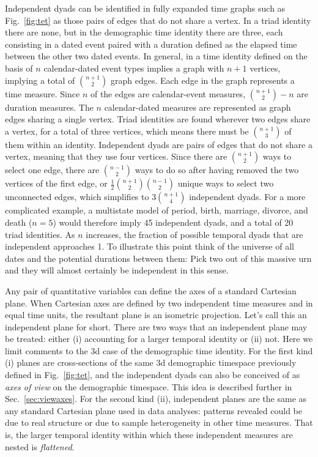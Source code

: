 Independent dyads can be identified in fully expanded time graphs such as Fig.~\ref{fig:tet} as those pairs of edges that do not share a vertex. In a triad identity there are none, but in the demographic time identity there are three, each consisting in a dated event paired with a duration defined as the elapsed time between the other two dated events. In general, in a time identity defined on the basis of $n$ calendar-dated event types implies a graph with $n+1$ vertices, implying a total of $\binom{n+1}{2}$ graph edges. Each edge in the graph represents a time measure. Since $n$ of the edges are calendar-event measures, $\binom{n+1}{2} - n$ are duration measures. The $n$ calendar-dated measures are represented as graph edges sharing a single vertex. Triad identities are found wherever two edges share a vertex, for a total of three vertices, which means there must be $\binom{n+1}{3}$ of them within an identity. Independent dyads are pairs of edges that do not share a vertex, meaning that they use four vertices. Since there are $\binom{n+1}{2}$ ways to select one edge, there are $\binom{n-1}{2}$ ways to do so after having removed the two vertices of the first edge, or $\frac{1}{2}\binom{n+1}{2}\binom{n-1}{2}$ unique ways to select two unconnected edges, which simplifies to $3\binom{n+1}{4}$ independent dyads. For a more complicated example, a multistate model of period, birth, marriage, divorce, and death ($n=5$) would therefore imply 45 independent dyads, and a total of 20 triad identities. As $n$ increases, the fraction of possible temporal dyads that are independent approaches 1. To illustrate this point think of the universe of all dates and the potential durations between them: Pick two out of this massive urn and they will almost certainly be independent in this sense.

Any pair of quantitative variables can define the axes of a standard Cartesian plane. When Cartesian axes are defined by two independent time measures and in equal time units, the resultant plane is an isometric projection. Let's call this an independent plane for short. There are two ways that an independent plane may be treated: either (i) accounting for a larger temporal identity or (ii) not. Here we limit comments to the 3d case of the demographic time identity. For the first kind (i) planes are cross-sections of the same 3d demographic timespace previously defined in Fig.~\ref{fig:tet}, and the independent dyads can also be conceived of as \emph{axes of view} on the demographic timespace. This idea is described further in Sec.~\ref{sec:viewaxes}. For the second kind (ii), independent planes are the same as any standard Cartesian plane used in data analyses: patterns revealed could be due to real structure or due to sample heterogeneity in other time measures. That is, the larger temporal identity within which these independent measures are nested is \emph{flattened}.

